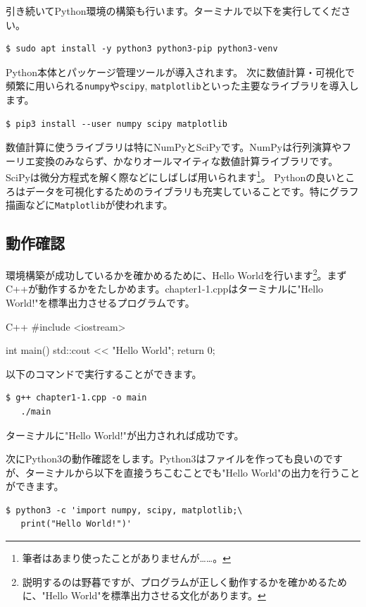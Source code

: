 \documentclass[12pt]{jreport}
\begin{document}
引き続いてPython環境の構築も行います。ターミナルで以下を実行してください。
\begin{lstlisting}[style=terminal]
  $ sudo apt install -y python3 python3-pip python3-venv
\end{lstlisting}
Python本体とパッケージ管理ツールが導入されます。
次に数値計算・可視化で頻繁に用いられる\texttt{numpy}や\texttt{scipy}, \texttt{matplotlib}といった主要なライブラリを導入します。
\begin{lstlisting}[style=terminal]
  $ pip3 install --user numpy scipy matplotlib
\end{lstlisting}
数値計算に使うライブラリは特にNumPyとSciPyです。NumPyは行列演算やフーリエ変換のみならず、かなりオールマイティな数値計算ライブラリです。SciPyは微分方程式を解く際などにしばしば用いられます\footnote{筆者はあまり使ったことがありませんが……。}。
Pythonの良いところはデータを可視化するためのライブラリも充実していることです。特にグラフ描画などに\texttt{Matplotlib}が使われます。

\subsection{動作確認}
環境構築が成功しているかを確かめるために、Hello Worldを行います\footnote{説明するのは野暮ですが、プログラムが正しく動作するかを確かめるために、"Hello World"を標準出力させる文化があります。}。まずC++が動作するかをたしかめます。chapter1-1.cppはターミナルに"Hello World!"を標準出力させるプログラムです。

\begin{codebox}{C++}
#include <iostream>

int main(){
    std::cout << "Hello World\n";
    return 0;
}
\end{codebox}

以下のコマンドで実行することができます。

\begin{lstlisting}[style=terminal]
  $ g++ chapter1-1.cpp -o main
   ./main
\end{lstlisting}
ターミナルに"Hello World!"が出力されれば成功です。

次にPython3の動作確認をします。Python3はファイルを作っても良いのですが、ターミナルから以下を直接うちこむことでも"Hello World"の出力を行うことができます。

\begin{lstlisting}[style=terminal]
  $ python3 -c 'import numpy, scipy, matplotlib;\ 
   print("Hello World!")'
\end{lstlisting}
\end{document}
